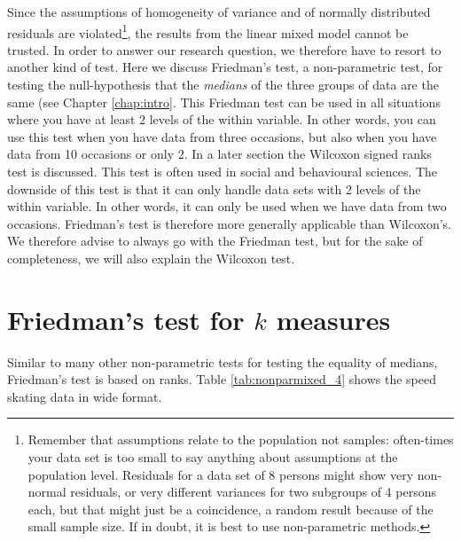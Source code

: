 \begin{knitrout}
\color{fgcolor}\begin{kframe}


{\ttfamily\noindent\bfseries{}}\end{kframe}
\end{knitrout}
Since the assumptions of homogeneity of variance and of normally distributed residuals are violated\footnote{Remember that assumptions relate to the population not samples: often-times your data set is too small to say anything about assumptions at the population level. Residuals for a data set of 8 persons might show very non-normal residuals, or very different variances for two subgroups of 4 persons each, but that might just be a coincidence, a random result because of the small sample size. If in doubt, it is best to use non-parametric methods.}, the results from the linear mixed model cannot be trusted. In order to answer our research question, we therefore have to resort to another kind of test. Here we discuss Friedman's test, a non-parametric test, for testing the null-hypothesis that the \textit{medians} of the three groups of data are the same (see Chapter \ref{chap:intro}. This Friedman test can be used in all situations where you have at least 2 levels of the within variable. In other words, you can use this test when you have data from three occasions, but also when you have data from 10 occasions or only 2. In a later section the Wilcoxon signed ranks test is discussed. This test is often used in social and behavioural sciences. The downside of this test is that it can only handle data sets with 2 levels of the within variable. In other words, it can only be used when we have data from two occasions. Friedman's test is therefore more generally applicable than Wilcoxon's. We therefore advise to always go with the Friedman test, but for the sake of completeness, we will also explain the Wilcoxon test.





\section{Friedman's test for $k$ measures}


Similar to many other non-parametric tests for testing the equality of medians, Friedman's test is based on ranks. Table \ref{tab:nonparmixed_4} shows the speed skating data in wide format.


